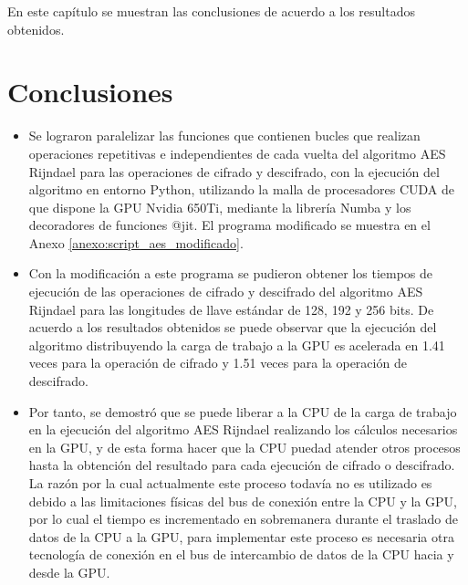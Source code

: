 \documentclass[../main/main.tex]{subfiles}
\begin{document}
\espacio
  En este capítulo se muestran las conclusiones de acuerdo a los resultados obtenidos.

  \section{Conclusiones}

  \begin{itemize}[noitemsep,nolistsep]
    \item Se lograron paralelizar las funciones que contienen bucles que realizan operaciones repetitivas e independientes de cada vuelta del algoritmo AES Rijndael para las operaciones de cifrado y descifrado, con la ejecución del algoritmo en entorno Python, utilizando la malla de procesadores CUDA de que dispone la GPU Nvidia 650Ti, mediante la librería Numba y los decoradores de funciones @jit. El programa modificado se muestra en el Anexo \ref{anexo:script_aes_modificado}.
    \item Con la modificación a este programa se pudieron obtener los tiempos de ejecución de las operaciones de cifrado y descifrado del algoritmo AES Rijndael para las longitudes de llave estándar de 128, 192 y 256 bits. De acuerdo a los resultados obtenidos se puede observar que la ejecución del algoritmo distribuyendo la carga de trabajo a la GPU es acelerada en 1.41 veces para la operación de cifrado y 1.51 veces para la operación de descifrado.
    \item Por tanto, se demostró que se puede liberar a la CPU de la carga de trabajo en la ejecución del algoritmo AES Rijndael realizando los cálculos necesarios en la GPU, y de esta forma hacer que la CPU puedad atender otros procesos hasta la obtención del resultado para cada ejecución de cifrado o descifrado. La razón por la cual actualmente este proceso todavía no es utilizado es debido a las limitaciones físicas del bus de conexión entre la CPU y la GPU, por lo cual el tiempo es incrementado en sobremanera durante el traslado de datos de la CPU a la GPU, para implementar este proceso es necesaria otra tecnología de conexión en el bus de intercambio de datos de la CPU hacia y desde la GPU.
  \end{itemize}
\end{document}
